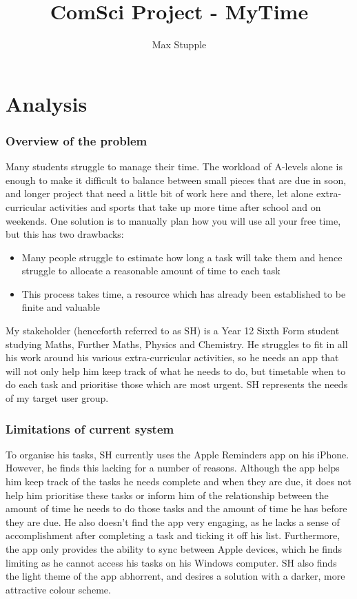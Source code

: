 \documentclass{article}
\title{ComSci Project - MyTime}
\author{Max Stupple}
\date{}
\begin{document}
    
\maketitle{}

\part{Analysis}
\section{Overview of the problem}
Many students struggle to manage their time. The workload of A-levels alone is
enough to make it difficult to balance between small pieces that are due in
soon, and longer project that need a little bit of work here and there, let
alone extra-curricular activities and sports that take up more time after school
and on weekends. One solution is to manually plan how you will use all your free
time, but this has two drawbacks:
        
\begin{itemize}
\item Many people struggle to estimate how long a task will take them and hence
  struggle to allocate a reasonable amount of time to each task
\item This process takes time, a resource which has already been established to
  be finite and valuable
\end{itemize}

My stakeholder (henceforth referred to as SH) is a Year 12 Sixth Form student
studying Maths, Further Maths, Physics and Chemistry. He struggles to fit in all
his work around his various extra-curricular activities, so he needs an app that
will not only help him keep track of what he needs to do, but timetable when to
do each task and prioritise those which are most urgent. SH represents the needs
of my target user group.

\section{Limitations of current system}
To organise his tasks, SH currently uses the Apple Reminders app on his iPhone.
However, he finds this lacking for a number of reasons. Although the app helps
him keep track of the tasks he needs complete and when they are due, it does not
help him prioritise these tasks or inform him of the relationship between the
amount of time he needs to do those tasks and the amount of time he has before
they are due. He also doesn't find the app very engaging, as he lacks a sense of
accomplishment after completing a task and ticking it off his list. Furthermore,
the app only provides the ability to sync between Apple devices, which he finds
limiting as he cannot access his tasks on his Windows computer. SH also finds
the light theme of the app abhorrent, and desires a solution with a darker, more
attractive colour scheme.
\end{document}
